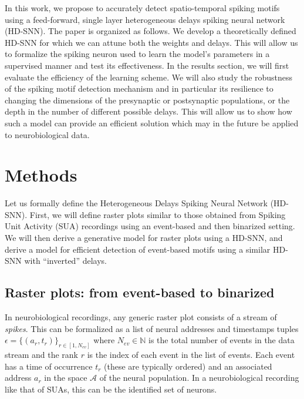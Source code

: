 \documentclass[runningheads]{llncs}
\newcommand{\presynaddr}{a} %
\newcommand{\numevent}{N_{ev}} %
\newcommand{\presynaddrspace}{\mathcal{A}} %
\newcommand{\arank}{r} %
\newcommand{\timev}{t} %
\newcommand{\event}{\epsilon} %
\begin{document}
In this work, we propose to accurately detect spatio-temporal spiking motifs using a feed-forward, single layer heterogeneous delays spiking neural network  (HD-SNN). The paper is organized as follows. We develop a theoretically defined HD-SNN for which we can attune both the weights and delays. %
This will allow us to formalize the spiking neuron used to learn the model's parameters in a supervised manner and test its effectiveness. In the results section, we will first evaluate the efficiency of the learning scheme. We will also study the robustness of the spiking motif detection mechanism and in particular its resilience to changing the dimensions of the presynaptic or postsynaptic populations, or the depth in the number of different possible delays. This will allow us to show how such a model can provide an efficient solution which may in the future be applied to neurobiological data.  %
%
\section{Methods}
\label{sec:methods}
Let us formally define the Heterogeneous Delays Spiking Neural Network (HD-SNN). First, we will define raster plots similar to those obtained from Spiking Unit Activity (SUA) recordings using an event-based and then binarized setting. We will then derive a generative model for raster plots using a HD-SNN, and derive a model for efficient detection of event-based motifs using a similar HD-SNN with ``inverted'' delays.
%
\subsection{Raster plots: from event-based to binarized}
%
In neurobiological recordings, %
any generic raster plot consists of a stream of \emph{spikes}. This can be formalized as a list of neural addresses and timestamps tuples $\event = \{(\presynaddr_\arank, \timev_\arank)\}_{\arank \in [1,\numevent]}$ where $\numevent \in \mathbb{N}$ is the total number of events in the data stream and the rank $\arank$ is the index of each event in the list of events. Each event has a time of occurrence $\timev_\arank$ (these are typically ordered) and an associated address $\presynaddr_\arank$ in the space $\presynaddrspace$ of the neural population. In a neurobiological recording like that of SUAs, this can be the identified set of neurons.
\end{document}

